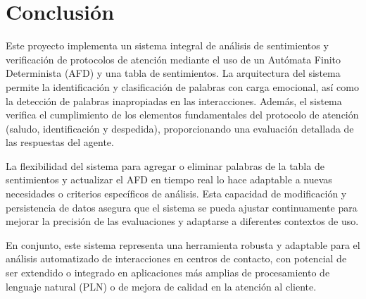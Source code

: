 \section{Conclusión}

Este proyecto implementa un sistema integral de análisis de sentimientos y verificación de
protocolos de atención mediante el uso de un Autómata Finito Determinista (AFD) y una tabla de
sentimientos. La arquitectura del sistema permite la identificación y clasificación de palabras
con carga emocional, así como la detección de palabras inapropiadas en las interacciones.
Además, el sistema verifica el cumplimiento de los elementos fundamentales del protocolo de
atención (saludo, identificación y despedida), proporcionando una evaluación detallada de las
respuestas del agente.

La flexibilidad del sistema para agregar o eliminar palabras de la tabla de sentimientos y
actualizar el AFD en tiempo real lo hace adaptable a nuevas necesidades o criterios específicos
de análisis. Esta capacidad de modificación y persistencia de datos asegura que el sistema se
pueda ajustar continuamente para mejorar la precisión de las evaluaciones y adaptarse a
diferentes contextos de uso.

En conjunto, este sistema representa una herramienta robusta y adaptable para el análisis
automatizado de interacciones en centros de contacto, con potencial de ser extendido o
integrado en aplicaciones más amplias de procesamiento de lenguaje natural (PLN) o de mejora de
calidad en la atención al cliente.

